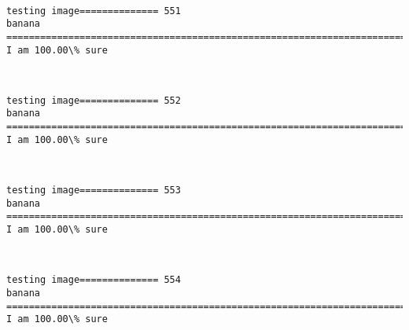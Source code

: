 \documentclass[11pt]{article}
\begin{document}
    \begin{center}
    \end{center}
    { \hspace*{\fill} \\}
    
    \begin{Verbatim}[commandchars=\\\{\}]
testing image============== 551
banana
============================================================================
I am 100.00\% sure

    \end{Verbatim}

    \begin{center}
    \end{center}
    { \hspace*{\fill} \\}
    
    \begin{Verbatim}[commandchars=\\\{\}]
testing image============== 552
banana
============================================================================
I am 100.00\% sure

    \end{Verbatim}

    \begin{center}
    \end{center}
    { \hspace*{\fill} \\}
    
    \begin{Verbatim}[commandchars=\\\{\}]
testing image============== 553
banana
============================================================================
I am 100.00\% sure

    \end{Verbatim}

    \begin{center}
    \end{center}
    { \hspace*{\fill} \\}
    
    \begin{Verbatim}[commandchars=\\\{\}]
testing image============== 554
banana
============================================================================
I am 100.00\% sure

    \end{Verbatim}
\end{document}
